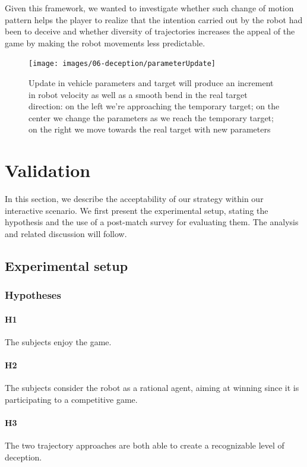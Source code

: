 Given this framework, we wanted to investigate whether such change of motion pattern helps the player to realize that the intention carried out by the robot had been to deceive and whether diversity of trajectories increases the appeal of the game by making the robot movements less predictable.

\begin{figure}[htbp]
    \centering
    \texttt{[image: images/06-deception/parameterUpdate]}
    \caption{Update in vehicle parameters and target will produce an increment in robot velocity as well as a smooth bend in the real target direction: on the left we're approaching the temporary target; on the center we change the parameters as we reach the temporary target; on the right we move towards the real target with new parameters}
    \label{fig::trajectorySteering}
\end{figure}

\section{Validation}
\label{sec:deception_validation}
In this section, we describe the acceptability of our strategy within our interactive scenario. We first present the experimental setup, stating the hypothesis and the use of a post-match survey for evaluating them. The analysis and related discussion will follow. 

\subsection{Experimental setup}
\subsubsection{Hypotheses}

\paragraph{H1} The subjects enjoy the game.
\paragraph{H2} The subjects consider the robot as a rational agent, aiming at winning since it is participating to a competitive game.
\paragraph{H3} The two trajectory approaches are both able to create a recognizable level of deception. 
